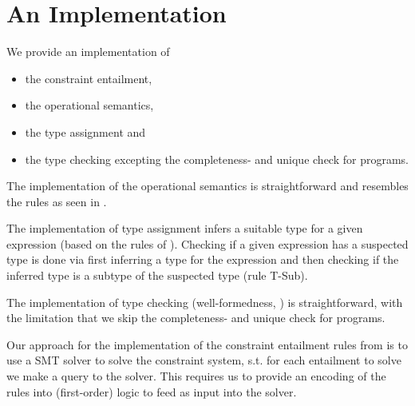 \documentclass[a4paper]{article}
\begin{document}
\newpage
%
\section{An Implementation}
We provide an implementation of
\begin{itemize}
  \item the constraint entailment,
  \item the operational semantics,
  \item the type assignment and
  \item the type checking excepting the completeness- and unique check for programs.
\end{itemize}

The implementation of the operational semantics is straightforward and resembles
the rules as seen in .

The implementation of type assignment infers a suitable type for a given expression
(based on the rules of ).
Checking if a given expression has a suspected type is done via
first inferring a type for the expression and then checking if the inferred type
is a subtype of the suspected type (rule T-Sub).

The implementation of type checking (well-formedness, ) is straightforward,
with the limitation that we skip the completeness- and unique check for programs.

Our approach for the implementation of the constraint entailment rules
from  is to use a SMT solver to solve the constraint system,
s.t. for each entailment to solve we make a query to the solver.
This requires us to provide an encoding of the rules into (first-order) logic
to feed as input into the solver.
\end{document}
